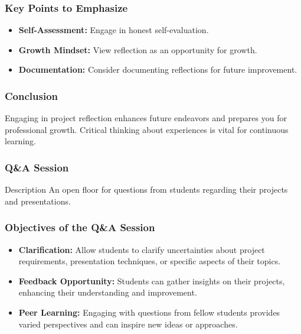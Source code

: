 \documentclass[aspectratio=169]{beamer}
\begin{document}
\begin{frame}[fragile]
    \frametitle{Key Points to Emphasize}
    \begin{itemize}
        \item \textbf{Self-Assessment:} Engage in honest self-evaluation.
        \item \textbf{Growth Mindset:} View reflection as an opportunity for growth.
        \item \textbf{Documentation:} Consider documenting reflections for future improvement.
    \end{itemize}
\end{frame}

\begin{frame}[fragile]
    \frametitle{Conclusion}
    Engaging in project reflection enhances future endeavors and prepares you for professional growth. Critical thinking about experiences is vital for continuous learning.
\end{frame}

\begin{frame}[fragile]
    \frametitle{Q\&A Session}
    \begin{block}{Description}
        An open floor for questions from students regarding their projects and presentations.
    \end{block}
\end{frame}

\begin{frame}[fragile]
    \frametitle{Objectives of the Q\&A Session}
    \begin{itemize}
        \item \textbf{Clarification:} Allow students to clarify uncertainties about project requirements, presentation techniques, or specific aspects of their topics.
        \item \textbf{Feedback Opportunity:} Students can gather insights on their projects, enhancing their understanding and improvement.
        \item \textbf{Peer Learning:} Engaging with questions from fellow students provides varied perspectives and can inspire new ideas or approaches.
    \end{itemize}
\end{frame}
\end{document}
